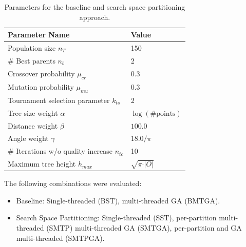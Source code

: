 \begin{table}[h]
	\centering
	\begin{tabular}{|l|l|}
		\hline
		\textbf{Parameter Name} & \textbf{Value}  \\
		\hline
		Population size $n_T$ & 150 \\
		\hline
		\# Best parents $n_b$ & 2 \\
		\hline
		Crossover probability $\mu_{cr}$& 0.3 \\
		\hline
		Mutation probability $\mu_{mu}$& 0.3 \\
		\hline
		Tournament selection parameter $k_{ts}$ & 2\\
		\hline
		Tree size weight $\alpha$& $\log(\text{\#points})$\\
		\hline
		Distance weight $\beta$& $100.0$ \\
		\hline
		Angle weight $\gamma$& $18.0/\pi$ \\
		\hline 
		\# Iterations w/o quality increase $n_{tc}$ & 10 \\
		\hline 
		Maximum tree height $h_{max}$ & $\sqrt{\pi\cdot \vert O \vert}$ \\
		\hline 
	\end{tabular}
	\caption{Parameters for the baseline and search space partitioning approach.}
	\label{tab:gaparams}
\end{table}
The following combinations were evaluated:
\begin{itemize}
	\item Baseline: Single-threaded (BST), multi-threaded \ac{GA} (BMTGA).
	\item Search Space Partitioning: Single-threaded (SST), per-partition multi-threaded (SMTP) multi-threaded \ac{GA} (SMTGA), per-partition and \ac{GA} multi-threaded (SMTPGA).
\end{itemize}   
